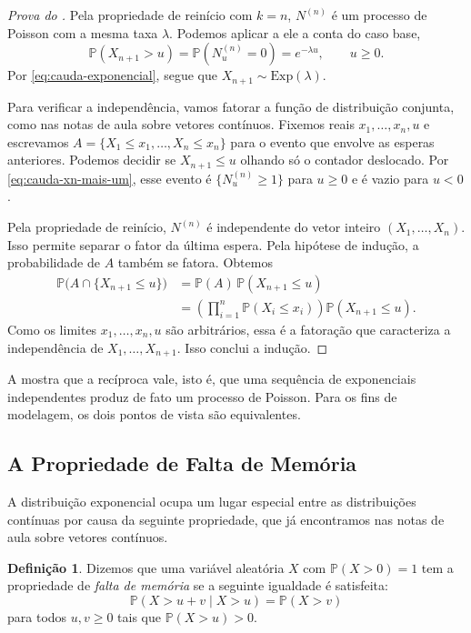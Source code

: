 \documentclass[12pt,portuguese]{article}
\theoremstyle{definition}
\newtheorem{definition}[definition]{Definição}
\theoremstyle{plainexercise}
\theoremstyle{starredexercise}
\theoremstyle{definition}
\begin{document}
\begin{proof}[Prova do ]
Pela propriedade de reinício com $k=n$, $N^{(n)}$ é um processo de Poisson
com a mesma taxa $\lambda$. Podemos aplicar a ele a conta do caso base,
\[
  \mathbb{P}(X_{n+1}>u)=\mathbb{P}(N^{(n)}_u=0)=e^{-\lambda u},
  \qquad u\geqslant 0.
\]
Por \eqref{eq:cauda-exponencial}, segue que $X_{n+1}\sim\mathrm{Exp}(\lambda)$.

Para verificar a independência, vamos fatorar a função de distribuição
conjunta, como nas notas de aula sobre vetores contínuos. Fixemos reais
$x_1,\ldots,x_n,u$ e escrevamos $A=\{X_1\leqslant x_1,\ldots,X_n\leqslant x_n\}$
para o evento que envolve as esperas anteriores. Podemos decidir se
$X_{n+1}\leqslant u$ olhando só o contador deslocado. Por
\eqref{eq:cauda-xn-mais-um}, esse evento é $\{N^{(n)}_u\geqslant 1\}$ para
$u\geqslant 0$ e é vazio para $u<0$.

Pela propriedade de reinício, $N^{(n)}$ é independente do vetor inteiro
$(X_1,\ldots,X_n)$. Isso permite separar o fator da última espera. Pela
hipótese de indução, a probabilidade de $A$ também se fatora. Obtemos
\begin{align*}
  \mathbb{P}\bigl(A\cap\{X_{n+1}\leqslant u\}\bigr)
  &=\mathbb{P}(A)\,\mathbb{P}(X_{n+1}\leqslant u)\\
  &=\left(\prod_{i=1}^n \mathbb{P}(X_i\leqslant x_i)\right)
    \mathbb{P}(X_{n+1}\leqslant u).
\end{align*}
Como os limites $x_1,\ldots,x_n,u$ são arbitrários, essa é a fatoração que
caracteriza a independência de $X_1,\ldots,X_{n+1}$. Isso conclui a indução.
\end{proof}

A  mostra que a recíproca vale, isto é, que
uma sequência de exponenciais independentes produz de fato um processo de
Poisson. Para os fins de modelagem, os dois pontos de vista são equivalentes.

\subsection{A Propriedade de Falta de Memória}\label{subsec:falta-memoria}

A distribuição exponencial ocupa um lugar especial entre as distribuições
contínuas por causa da seguinte propriedade, que já encontramos nas notas de
aula sobre vetores contínuos.

\begin{definition}\label{def:falta-memoria}
Dizemos que uma variável aleatória $X$ com $\mathbb{P}(X>0)=1$ tem a
propriedade de \emph{falta de memória} se a seguinte igualdade é satisfeita:
\begin{equation}\label{eq:falta-memoria}
  \mathbb{P}(X>u+v\mid X>u)=\mathbb{P}(X>v)
\end{equation}
para todos $u,v\geqslant0$ tais que $\mathbb{P}(X>u)>0$.
\end{definition}
\end{document}
